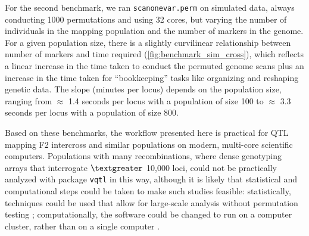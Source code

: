 \documentclass[9pt,twocolumn,twoside]{gsag3jnl}
\begin{document}
For the second benchmark, we ran \texttt{scanonevar.perm} on simulated data, always conducting 1000 permutations and using 32 cores, but varying the number of individuals in the mapping population and the number of markers in the genome.
For a given population size, there is a slightly curvilinear relationship between number of markers and time required (\autoref{fig:benchmark_sim_cross}), which reflects a linear increase in the time taken to conduct the permuted genome scans plus an increase in the time taken for ``bookkeeping'' tasks like organizing and reshaping genetic data.
The slope (minutes per locus) depends on the population size, ranging from $\approx$ 1.4 seconds per locus with a population of size 100 to $\approx$ 3.3 seconds per locus with a population of size 800.

Based on these benchmarks, the workflow presented here is practical for QTL mapping F2 intercross and similar populations on modern, multi-core scientific computers.
Populations with many recombinations, where dense genotyping arrays that interrogate $\textgreater$ 10,000 loci, could not be practically analyzed with package \texttt{vqtl} in this way, although it is likely that statistical and computational steps could be taken to make such studies feasible:
statistically, techniques could be used that allow for large-scale analysis without permutation testing \citep{Efron2004};
computationally, the software could be changed to run on a computer cluster, rather than on a single computer \citep{Jette2003a,Marchand2017}.

\end{document}
